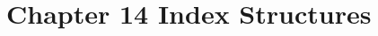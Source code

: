 \documentclass[../../main.tex]{subfiles}
\begin{document}
\section{Chapter 14 Index Structures}



\end{document}
